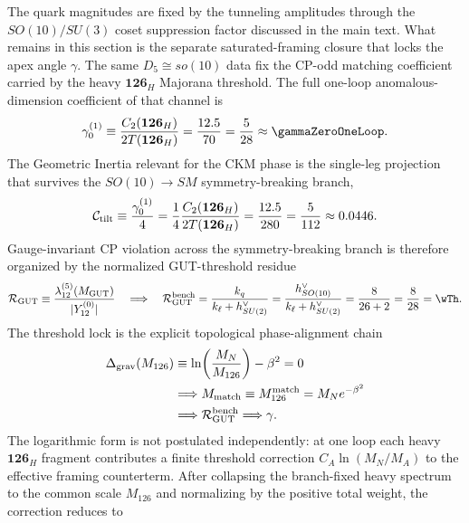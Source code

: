 \documentclass[11pt]{article}
\begin{document}
The quark magnitudes are fixed by the tunneling amplitudes through the
$SO(10)/SU(3)$ coset suppression factor discussed in the main text. What remains in this
section is the separate saturated-framing closure that locks the apex angle
$\gamma$. The same $D_5\cong so(10)$ data fix the CP-odd matching coefficient
carried by the heavy $\mathbf{126}_H$ Majorana threshold. The full one-loop
anomalous-dimension coefficient of that channel is
\begin{equation}
 \gamma_0^{(1)}
 \equiv
 \frac{C_2(\mathbf{126}_H)}{2T(\mathbf{126}_H)}
 =
 \frac{12.5}{70}
 =
 \frac{5}{28}
 \approx \gammaZeroOneLoop.
\end{equation}
The Geometric Inertia relevant for the CKM phase is the single-leg projection that survives the $SO(10)\to SM$ symmetry-breaking branch,
\begin{equation}
 \mathcal C_{\rm tilt}
 \equiv
 \frac{\gamma_0^{(1)}}{4}
 =
 \frac{1}{4}\frac{C_2(\mathbf{126}_H)}{2T(\mathbf{126}_H)}
 =
 \frac{12.5}{280}
 =
 \frac{5}{112}
 \approx 0.0446.
\end{equation}
Gauge-invariant CP violation across the symmetry-breaking branch is therefore organized by the normalized GUT-threshold residue
\begin{equation}
 \mathcal R_{\rm GUT}
 \equiv
 \frac{\lambda_{12}^{(5)}(M_{\rm GUT})}{|Y_{12}^{(0)}|}
 \quad\Longrightarrow\quad
 \mathcal R_{\rm GUT}^{\rm bench}
 =
 \frac{k_q}{k_{\ell}+h^{\vee}_{SU(2)}}
 =
 \frac{h^{\vee}_{SO(10)}}{k_{\ell}+h^{\vee}_{SU(2)}}
 =
 \frac{8}{26+2}
 =
 \frac{8}{28}
 =
 \wTh.
\end{equation}
The threshold lock is the explicit topological phase-alignment chain
\begin{equation}
 \begin{aligned}
  \Delta_{\rm grav}(M_{126})
  &\equiv
  \ln\!\left(\frac{M_N}{M_{126}}\right)-\beta^2=0 \\
  &\Longrightarrow
  M_{\rm match}\equiv M_{126}^{\rm match}=M_N e^{-\beta^2} \\
  &\Longrightarrow
  \mathcal R_{\rm GUT}^{\rm bench}
  \Longrightarrow
  \gamma.
 \end{aligned}
\end{equation}
The logarithmic form is not postulated independently: at one loop each heavy
$\mathbf{126}_H$ fragment contributes a finite threshold correction
$C_A\ln(M_N/M_A)$ to the effective framing counterterm. After collapsing the
branch-fixed heavy spectrum to the common scale $M_{126}$ and normalizing by
the positive total weight, the correction reduces to
\end{document}
